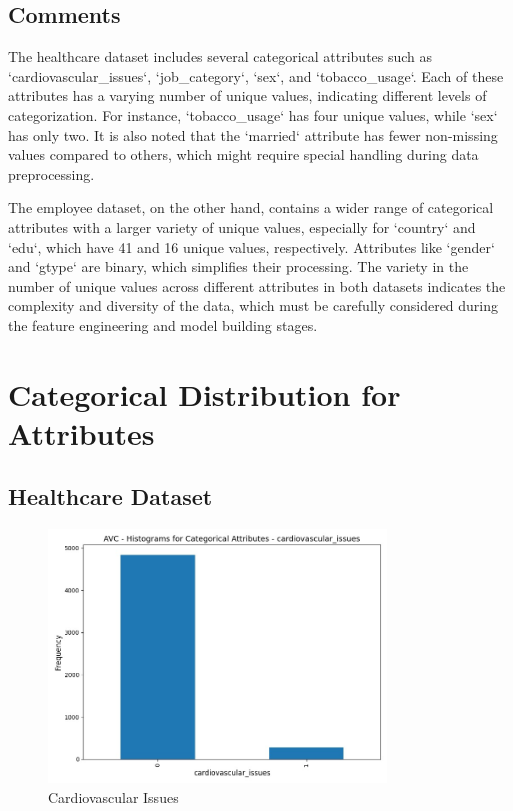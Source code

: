 \documentclass[a4paper,12pt]{article}
\begin{document}
\newpage
\subsection{Comments}

The healthcare dataset includes several categorical attributes such as `cardiovascular\_issues`, `job\_category`, `sex`, and `tobacco\_usage`. Each of these attributes has a varying number of unique values, indicating different levels of categorization. For instance, `tobacco\_usage` has four unique values, while `sex` has only two. It is also noted that the `married` attribute has fewer non-missing values compared to others, which might require special handling during data preprocessing.

The employee dataset, on the other hand, contains a wider range of categorical attributes with a larger variety of unique values, especially for `country` and `edu`, which have 41 and 16 unique values, respectively. Attributes like `gender` and `gtype` are binary, which simplifies their processing. The variety in the number of unique values across different attributes in both datasets indicates the complexity and diversity of the data, which must be carefully considered during the feature engineering and model building stages.

\section{Categorical Distribution for Attributes}

\subsection{Healthcare Dataset}
\begin{figure}[H]
    \centering
    \includegraphics[width=0.8\textwidth]{Resources/histogram_cardio_issues.jpeg}
    \caption{Cardiovascular Issues}
\end{figure}
\end{document}
